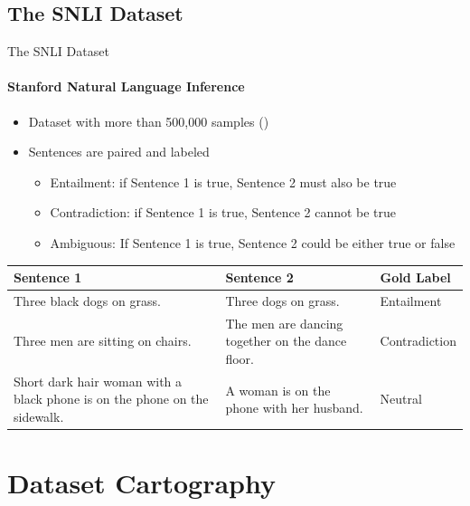 \documentclass[
	11pt,
]{beamer}
\begin{document}
\subsection{The SNLI Dataset}
\begin{frame}{The SNLI Dataset}
	\framesubtitle{Stanford Natural Language Inference}
	\begin{itemize}
		\item Dataset with more than 500,000 samples (\cite{snli:emnlp2015})
		\item Sentences are paired and labeled
		      \begin{itemize}
			      \item Entailment: if Sentence 1 is true, Sentence 2 must also be true
			      \item Contradiction: if Sentence 1 is true, Sentence 2 cannot be true
			      \item Ambiguous: If Sentence 1 is true, Sentence 2 could be either true or false
		      \end{itemize}
	\end{itemize}
	\vspace{.2cm}
	\fontsize{8pt}{10pt}\selectfont
	\begin{tabular}{| M{4.1cm} | M{4.1cm}| M{2cm} |}
		\hline
		Sentence 1                                                                & Sentence 2                                       & Gold Label    \\ \hline
		Three black dogs on grass.                                                & Three dogs on grass.                             & Entailment    \\ \hline
		Three men are sitting on chairs.                                          & The men are dancing together on the dance floor. & Contradiction \\ \hline
		Short dark hair woman with a black phone is on the phone on the sidewalk. & A woman is on the phone with her husband.        & Neutral       \\
		\hline
	\end{tabular}
\end{frame}



\section{Dataset Cartography}
\end{document}
